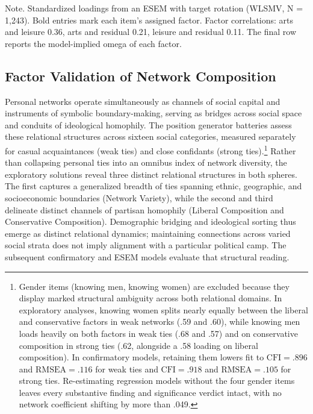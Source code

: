 \documentclass[
  12pt
]{article}
\begin{document}
Note. Standardized loadings from an ESEM with target rotation (WLSMV, N = 1,243). Bold entries mark each item's assigned factor. Factor correlations: arts and leisure 0.36, arts and residual 0.21, leisure and residual 0.11. The final row reports the model-implied omega of each factor.


\subsection{Factor Validation of Network Composition}\label{factor-validation-of-network-composition}

Personal networks operate simultaneously as channels of social capital and instruments of symbolic boundary-making, serving as bridges across social space and conduits of ideological homophily. The position generator batteries assess these relational structures across sixteen social categories, measured separately for casual acquaintances (weak ties) and close confidants (strong ties).\footnote{Gender items (knowing men, knowing women) are excluded because they display marked structural ambiguity across both relational domains. In exploratory analyses, knowing women splits nearly equally between the liberal and conservative factors in weak networks (.59 and .60), while knowing men loads heavily on both factors in weak ties (.68 and .57) and on conservative composition in strong ties (.62, alongside a .58 loading on liberal composition). In confirmatory models, retaining them lowers fit to $\text{CFI} = .896$ and $\text{RMSEA} = .116$ for weak ties and $\text{CFI} = .918$ and $\text{RMSEA} = .105$ for strong ties. Re-estimating regression models without the four gender items leaves every substantive finding and significance verdict intact, with no network coefficient shifting by more than .049.} Rather than collapsing personal ties into an omnibus index of network diversity, the exploratory solutions reveal three distinct relational structures in both spheres. The first captures a generalized breadth of ties spanning ethnic, geographic, and socioeconomic boundaries (Network Variety), while the second and third delineate distinct channels of partisan homophily (Liberal Composition and Conservative Composition). Demographic bridging and ideological sorting thus emerge as distinct relational dynamics; maintaining connections across varied social strata does not imply alignment with a particular political camp. The subsequent confirmatory and ESEM models evaluate that structural reading.
\end{document}
